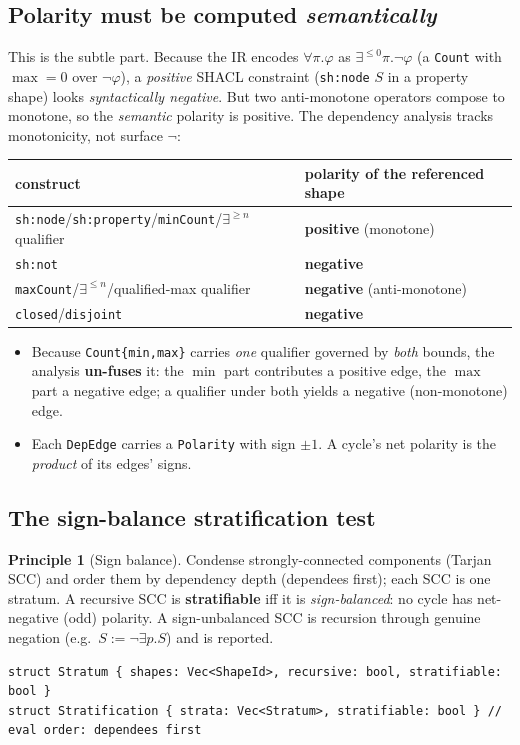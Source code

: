 \documentclass[11pt]{article}
\newcommand{\code}[1]{\texttt{#1}}
\theoremstyle{definition}
\newtheorem{principle}{Principle}[section]
\begin{document}
\subsection{Polarity must be computed \emph{semantically}}\label{sec:polarity}
This is the subtle part. Because the IR encodes $\forall\pi.\varphi$ as
$\exists^{\leq0}\pi.\neg\varphi$ (a \code{Count} with $\max{=}0$ over $\neg\varphi$),
a \emph{positive} SHACL constraint (\code{sh:node} $S$ in a property shape) looks
\emph{syntactically negative}. But two anti-monotone operators compose to
monotone, so the \emph{semantic} polarity is positive. The dependency analysis
tracks monotonicity, not surface $\neg$:
\begin{center}
\small
\begin{tabular}{@{}ll@{}}
\toprule
construct & polarity of the referenced shape \\
\midrule
\code{sh:node}/\code{sh:property}/\code{minCount}/$\exists^{\geq n}$ qualifier & \textbf{positive} (monotone) \\
\code{sh:not} & \textbf{negative} \\
\code{maxCount}/$\exists^{\leq n}$/qualified-max qualifier & \textbf{negative} (anti-monotone) \\
\code{closed}/\code{disjoint} & \textbf{negative} \\
\bottomrule
\end{tabular}
\end{center}
\begin{itemize}[leftmargin=1.4em]
  \item Because \code{Count\{min,max\}} carries \emph{one} qualifier governed by
  \emph{both} bounds, the analysis \textbf{un-fuses} it: the $\min$ part
  contributes a positive edge, the $\max$ part a negative edge; a qualifier under
  both yields a negative (non-monotone) edge.
  \item Each \code{DepEdge} carries a \code{Polarity} with sign $\pm1$. A cycle's
  net polarity is the \emph{product} of its edges' signs.
\end{itemize}

\subsection{The sign-balance stratification test}
\begin{principle}[Sign balance]
Condense strongly-connected components (Tarjan SCC) and order them by dependency
depth (dependees first); each SCC is one stratum. A recursive SCC is
\textbf{stratifiable} iff it is \emph{sign-balanced}: no cycle has net-negative
(odd) polarity. A sign-unbalanced SCC is recursion through genuine negation
(e.g.\ $S:=\neg\exists p.S$) and is reported.
\end{principle}
\begin{lstlisting}
struct Stratum { shapes: Vec<ShapeId>, recursive: bool, stratifiable: bool }
struct Stratification { strata: Vec<Stratum>, stratifiable: bool } // eval order: dependees first
\end{lstlisting}
\end{document}
